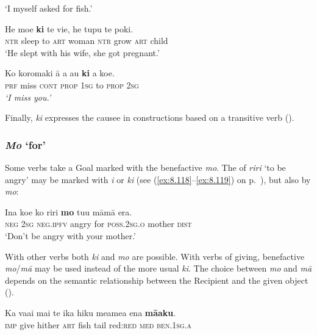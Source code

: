 \glt 
‘I myself asked for fish.’ \textstyleExampleref{[Mtx-7-04.061]}
\z

\ea\label{ex:8.176}
\gll He moe \textbf{ki} te vi{\ꞌ}e, he tupu te poki. \\
\textsc{ntr} sleep to \textsc{art} woman \textsc{ntr} grow \textsc{art} child \\

\glt 
‘He slept with his wife, she got pregnant.’ \textstyleExampleref{[Mtx-7-20.002]}
\z

\ea\label{ex:8.177}
\gll Ko koromaki {\ꞌ}ā a au \textbf{ki} a koe.\\
\textsc{prf} miss \textsc{cont} \textsc{prop} \textsc{1sg} to \textsc{prop} \textsc{2sg}\\

\glt
\textit{\textup{‘}}\textit{I miss you.’} \textstyleExampleref{[R208.203]} 
\z

Finally, \textit{ki} expresses the causee in  constructions based on a transitive verb ().

\subsubsection{\textit{Mo} ‘for’}
Some verbs take a Goal  marked with the benefactive  \textit{mo}. The  of \textit{riri} ‘to be angry’ may be marked with \textit{i} or \textit{ki} (see (\ref{ex:8.118}–\ref{ex:8.119}) on p.~\pageref{ex:8.118}), but also by \textit{mo}:

\ea\label{ex:8.178}
\gll {\ꞌ}Ina koe ko riri \textbf{mo} tu{\ꞌ}u māmā era.\\
\textsc{neg} \textsc{2sg} \textsc{neg.ipfv} angry for \textsc{poss.2sg.o}\textsc{} mother \textsc{dist}\\

\glt
‘Don’t be angry with your mother.’ \textstyleExampleref{[R103.071]} 
\z

With other verbs both \textit{ki} and \textit{mo} are possible. With verbs of giving, benefactive \textit{mo}/\textit{mā} may be used instead of the more usual \textit{ki}. The choice between \textit{mo} and \textit{mā} depends on the semantic relationship between the Recipient and the given object ().

\ea\label{ex:8.179}
\gll Ka va{\ꞌ}ai mai te ika hiku meamea ena \textbf{mā{\ꞌ}aku}.\\
\textsc{imp} give hither \textsc{art} fish tail red:\textsc{red} \textsc{med} \textsc{ben.1sg.a}\\

